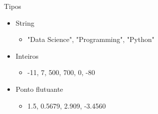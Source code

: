
\begin{frame}[t, fragile]{Tipos}
  \begin{itemize}
    \item String
    \begin{itemize}
      \item "Data Science", "Programming", "Python"
    \end{itemize}
    \item Inteiros
    \begin{itemize}
      \item -11, 7, 500, 700, 0, -80
    \end{itemize}
    \item Ponto flutuante
    \begin{itemize}
      \item 1.5, 0.5679, 2.909, -3.4560
    \end{itemize}
  \end{itemize}
\end{frame}

 